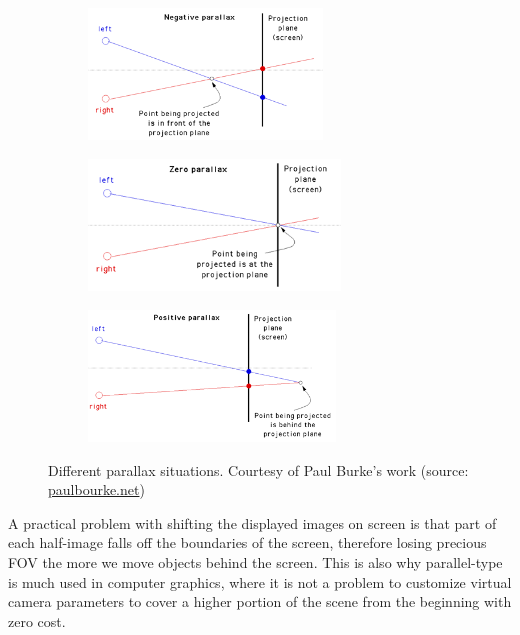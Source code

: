 \begin{figure}
\centering
\begin{subfigure}{0.32\textwidth}
\includegraphics[width=\linewidth, height=3.5cm]{schemas/negative_parallax}
\end{subfigure}
\hspace{\fill}
\begin{subfigure}{0.32\textwidth}
\includegraphics[width=\linewidth, height=3.5cm]{schemas/zero_parallax}
\end{subfigure}
\hspace{\fill}
\begin{subfigure}{0.32\textwidth}
\includegraphics[width=\linewidth, height=3.5cm]{schemas/positive_parallax}
\end{subfigure}
\caption{Different parallax situations. Courtesy of Paul Burke's work (source: \href{http://paulbourke.net/stereographics/stereorender/}{paulbourke.net}) \cite{stereo_pair_cameras}}
\label{fig:parallax_plane}
\end{figure}

A practical problem with shifting the displayed images on screen is that part of each half-image falls off the boundaries of the screen, therefore losing precious FOV the more we move objects behind the screen. This is also why parallel-type is much used in computer graphics, where it is not a problem to customize virtual camera parameters to cover a higher portion of the scene from the beginning with zero cost.

